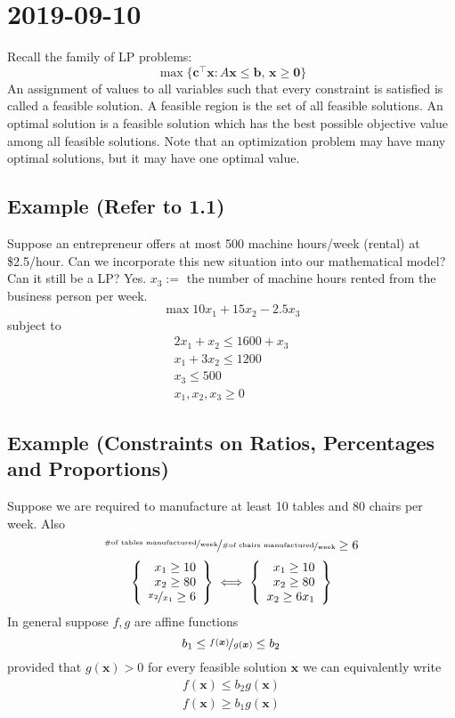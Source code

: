 \section{2019-09-10}
Recall the family of LP problems:
\[\max \{\bm{c}^\top \bm{x} : A\bm{x}\le \bm{b},\,\bm{x}\ge \bm{0}\} \]
An assignment of values to all variables such that every
constraint is satisfied is called a feasible solution.
A feasible region is the set of all feasible solutions.
An optimal solution is a feasible solution which has the best
possible objective value among all feasible solutions.
Note that an optimization problem may have many optimal
solutions, but it may have one optimal value.
\subsection{Example (Refer to 1.1)}
Suppose an entrepreneur offers at most 500 machine hours/week
(rental) at \$2.5/hour. Can we incorporate this new situation
into our mathematical model? Can it still be a LP? Yes.
$x_3:=$ the number of machine hours rented from the business
person per week.
\[\max 10x_1+15x_2-2.5x_3\]
subject to
\begin{align*}
    2x_1+x_2\le 1600+x_3\\
    x_1+3x_2\le 1200\\
    x_3\le 500\\
    x_1,x_2,x_3\ge 0
\end{align*}

\subsection{Example (Constraints on Ratios, Percentages and Proportions)}
Suppose we are required to manufacture at least 10 tables and
80 chairs per week. Also 
\[\nicefrac{\nicefrac{\text{\#of tables manufactured}}{\text{week}}}
{\nicefrac{\text{\#of chairs manufactured}}{\text{week}}}
\ge 6\]
\[
   \left\{\begin{array}{r}
        x_1\ge 10\\
        x_2\ge 80\\
        \nicefrac{x_2}{x_1}\ge 6
    \end{array}\right\}
    \iff
    \left\{\begin{array}{r}
        x_1\ge 10\\
        x_2\ge 80\\
        x_2\ge 6x_1
    \end{array}\right\}
\]
In general suppose $f,g$ are affine functions
\[
    b_1\le \nicefrac{f(\bm{x})}{g(\bm{x})}\le b_2
\]
provided that $g(\bm{x})>0$ for every feasible solution $\bm{x}$ we
can equivalently write
\begin{align*}
    f(\bm{x})\le b_2 g(\bm{x})\\
    f(\bm{x})\ge b_1 g(\bm{x})
\end{align*}


